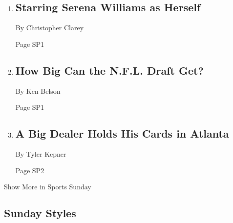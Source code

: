 \begin{enumerate}
\def\labelenumi{\arabic{enumi}.}
\item
  \href{/2018/04/27/sports/tennis/serena-williams.html}{}

  \hypertarget{starring-serena-williams-as-herself-1}{%
  \subsection{Starring Serena Williams as
  Herself}\label{starring-serena-williams-as-herself-1}}

  By Christopher Clarey

  Page SP1
\item
  \href{/2018/04/27/sports/football/roger-goodell-nfl-draft.html}{}

  \hypertarget{how-big-can-the-nfl-draft-get}{%
  \subsection{How Big Can the N.F.L. Draft
  Get?}\label{how-big-can-the-nfl-draft-get}}

  By Ken Belson

  Page SP1
\item
  \href{/2018/04/27/sports/baseball/braves-atlanta-danny-farquhar.html}{}

  \hypertarget{a-big-dealer-holds-his-cards-in-atlanta}{%
  \subsection{A Big Dealer Holds His Cards in
  Atlanta}\label{a-big-dealer-holds-his-cards-in-atlanta}}

  By Tyler Kepner

  Page SP2
\end{enumerate}

Show More in Sports Sunday

\hypertarget{sunday-styles}{%
\subsection{Sunday Styles}\label{sunday-styles}}

